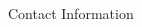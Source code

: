 \documentclass[final,hyperref={pdfpagelabels=false}]{beamer}
\begin{document}
\begin{frame}[t]
\begin{columns}[t]
\begin{column}{.465\textwidth}
\begin{block}{Contact Information}
            \end{block}



        \end{column} %

        \begin{column}{.015\textwidth}\end{column} %

    \end{columns} %

\end{frame} %
\end{document}
